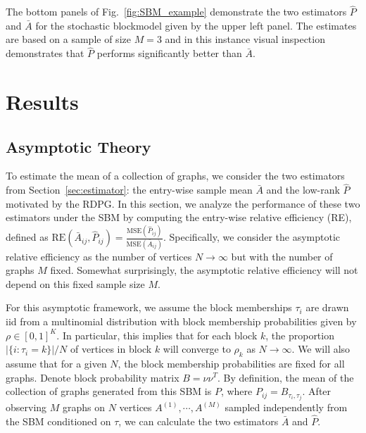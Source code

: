 \documentclass[10pt,letterpaper]{article}
\renewcommand{\hat}{\widehat}
\begin{document}
The bottom panels of Fig.~\ref{fig:SBM_example} demonstrate the two estimators $\hat{P}$ and $\bar{A}$ for the stochastic blockmodel given by the upper left panel. 
The estimates are based on a sample of size $M=3$ and in this instance visual inspection demonstrates that $\hat{P}$ performs significantly better than $\bar{A}$.



\section{Results}
\label{sec:result}

\subsection{Asymptotic Theory}
\label{section:theoretical_result}
To estimate the mean of a collection of graphs, we consider the two estimators from Section~\ref{sec:estimator}: the entry-wise sample mean $\bar{A}$ and the low-rank $\hat{P}$ motivated by the RDPG.
In this section, we analyze the performance of these two estimators under the SBM by computing the entry-wise relative efficiency (RE), defined as $\mathrm{RE}(\bar{A}_{ij}, \hat{P}_{ij}) = \frac{\mathrm{MSE}(\hat{P}_{ij})}{\mathrm{MSE}(\bar{A}_{ij})}$.
Specifically, we consider the asymptotic relative efficiency as the number of vertices $N\to\infty$ but with the number of graphs $M$ fixed.
Somewhat surprisingly, the asymptotic relative efficiency will not depend on this fixed sample size $M$.

For this asymptotic framework, we assume the block memberships $\tau_i$ are drawn iid from a multinomial distribution with block membership probabilities given by $\rho\in[0,1]^K$.
In particular, this implies that for each block $k$, the proportion $|\{i:\tau_i=k\}|/N$ of vertices in block $k$ will converge to $\rho_k$ as $N\to\infty$.
We will also assume that for a given $N$, the block membership probabilities are fixed for all graphs.
Denote block probability matrix $B = \nu \nu^T$. 
By definition, the mean of the collection of graphs generated from this SBM is $P$, where $P_{ij} = B_{\tau_i, \tau_j}$. After observing $M$ graphs on $N$ vertices $A^{(1)}, \cdots, A^{(M)}$ sampled independently from the SBM conditioned on $\tau$, we can calculate the two estimators $\bar{A}$ and $\hat{P}$.
\end{document}
